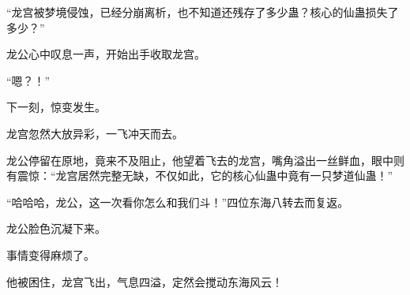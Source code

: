 \begin{this_body}
“龙宫被梦境侵蚀，已经分崩离析，也不知道还残存了多少蛊？核心的仙蛊损失了多少？”

龙公心中叹息一声，开始出手收取龙宫。

“嗯？！”

下一刻，惊变发生。

龙宫忽然大放异彩，一飞冲天而去。

龙公停留在原地，竟来不及阻止，他望着飞去的龙宫，嘴角溢出一丝鲜血，眼中则有震惊：“龙宫居然完整无缺，不仅如此，它的核心仙蛊中竟有一只梦道仙蛊！”

“哈哈哈，龙公，这一次看你怎么和我们斗！”四位东海八转去而复返。

龙公脸色沉凝下来。

事情变得麻烦了。

他被困住，龙宫飞出，气息四溢，定然会搅动东海风云！

\end{this_body}

